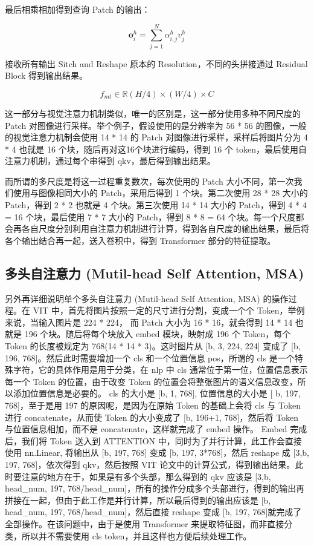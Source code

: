 最后相乘相加得到查询 Patch 的输出：

$$
\boldsymbol{o}_{i}^{h}=\sum_{j=1}^{N} \alpha_{i, j}^{h} v_{j}^{h}
$$

接收所有输出 Sitch and Reshape 原本的 Resolution，不同的头拼接通过 Residual Block 得到输出结果。

$$
f_{m t} \in \mathbb{R}(H / 4) \times(W / 4) \times C
$$

这一部分与视觉注意力机制类似，唯一的区别是，这一部分使用多种不同尺度的 Patch 对图像进行采样。举个例子，假设使用的是分辨率为 56 * 56 的图像，一般的视觉注意力机制会使用 14 * 14 的 Patch 对图像进行采样，采样后将图片分为 4 * 4 也就是 16 个块，随后再对这16个块进行编码，得到 16 个 token，最后使用自注意力机制，通过每个串得到 qkv，最后得到输出结果。

而所谓的多尺度是将这一过程重复数次，每次使用的 Patch 大小不同，第一次我们使用与图像相同大小的 Patch，采用后得到 1 个块。第二次使用 28 * 28 大小的 Patch，得到 2 * 2 也就是 4 个块。第三次使用 14 * 14 大小的 Patch，得到 4 * 4 = 16 个块，最后使用 7 * 7 大小的 Patch，得到 8 * 8 = 64 个块。每一个尺度都会再各自尺度分别利用自注意力机制进行计算，得到各自尺度的输出结果，最后将各个输出结合再一起，送入卷积中，得到 Transformer 部分的特征提取。


\subsection{多头自注意力 (Mutil-head Self Attention, MSA)}

另外再详细说明单个多头自注意力 (Mutil-head Self Attention, MSA) 的操作过程。在 VIT 中，首先将图片按照一定的尺寸进行分割，变成一个个 Token，举例来说，当输入图片是 224 * 224， 而 Patch 大小为 16 * 16，就会得到 14 * 14 也就是 196 个块。随后将每个块放入 embed 模块，映射成 196 个 Token，每个 Token 的长度被规定为 768(14 * 14 * 3)。这时图片从 [b, 3, 224, 224] 变成了 [b, 196, 768]。然后此时需要增加一个 cls 和一个位置信息 pos，所谓的 cls 是一个特殊字符，它的具体作用是用于分类，在 nlp 中 cls 通常位于第一位，位置信息表示每一个 Token 的位置，由于改变 Token 的位置会将整张图片的语义信息改变，所以添加位置信息是必要的。 cls 的大小是 [b, 1, 768], 位置信息的大小是 [ b, 197, 768]，至于是用 197 的原因呢，是因为在原始 Token 的基础上会将 cls 与 Token 进行 concatenate，从而使 Token 的大小变成了 [b, 196+1, 768]，然后将 Token 与位置信息相加，而不是 concatenate，这样就完成了 embed 操作。 Embed 完成后，我们将 Token 送入到 ATTENTION 中，同时为了并行计算，此工作会直接使用 nn.Linear, 将输出从 [b, 197, 768] 变成 [b, 197, 3*768]，然后 reshape 成 [3,b, 197, 768]，依次得到 qkv，然后按照 VIT 论文中的计算公式，得到输出结果。此时要注意的地方在于，如果是有多个头部，那么得到的 qkv 应该是 [3,b, head\_num, 197, 768/head\_num]，所有的操作分成多个头部进行，得到的输出再拼接在一起，但由于此工作是并行计算，所以最后得到的输出应该是 [b, head\_num, 197, 768/head\_num]，然后直接 reshape 变成 [b, 197, 768]就完成了全部操作。在该问题中，由于是使用 Transformer 来提取特征图，而非直接分类，所以并不需要使用 cls token，并且这样也方便后续处理工作。

